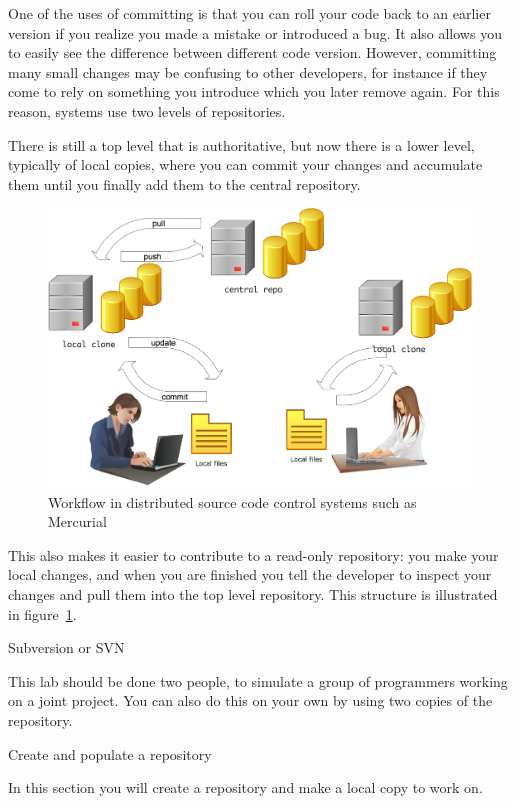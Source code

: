 One of the uses of committing is that you can roll your code back to
an earlier version if you realize you made a mistake or introduced a
bug. It also allows you to easily see the difference between different
code version. However, committing many small changes may be confusing
to other developers, for instance if they come to rely on something
you introduce which you later remove again. For this reason,
 systems use two levels
of repositories.

There is still a top level that is authoritative, but
now there is a lower level, typically of local copies, where you can
commit your changes and accumulate them until you finally add them to
the central repository.
\begin{figure}[ht]
\includegraphics[scale=.19]{graphics/repo-flow-hg}
\caption{Workflow in distributed source code control systems such as Mercurial}
\label{fig:hg}
\end{figure}
This also makes it easier to contribute to a read-only repository:
you make your local changes, and when you are finished you tell the 
developer to inspect your changes and pull them into the top level 
repository. This structure is illustrated in figure~\ref{fig:hg}.

 {Subversion or SVN}

This lab should be done two people, to simulate a group of programmers
working on a joint project. You can also do this on your own by using
two copies of the repository.

 {Create and populate a repository}

\begin{purpose}
  In this section you will create a repository and make a local copy
  to work on.
\end{purpose}

